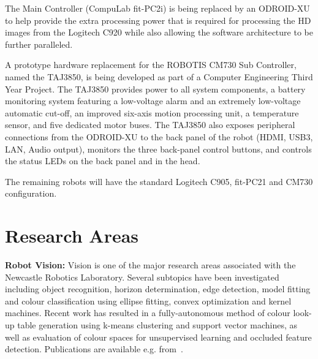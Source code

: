 \documentclass{llncs}
\begin{document}
The Main Controller (CompuLab fit-PC2i) is being replaced by an ODROID-XU to help provide the extra processing power that is required for processing the HD images from the Logitech C920 while also allowing the software architecture to be further paralleled.

A prototype hardware replacement for the ROBOTIS CM730 Sub Controller, named the TAJ3850, is 
being developed as part of a Computer Engineering Third Year Project. The TAJ3850 provides power to all system components, a battery monitoring system featuring a low-voltage alarm and an extremely low-voltage automatic cut-off, an improved six-axis motion processing unit, a temperature sensor, and five dedicated motor buses. The TAJ3850 also exposes peripheral connections from the ODROID-XU to the back panel of the robot (HDMI, USB3, LAN, Audio output), monitors the three back-panel control buttons, and controls the status LEDs on the back panel and in the head.



The remaining robots will have the standard Logitech C905, fit-PC21 and CM730 configuration.

\section{Research Areas}

\noindent\textbf{Robot Vision:} Vision is one of the major research areas associated with the Newcastle Robotics Laboratory. Several subtopics have been investigated including object recognition, horizon determination, edge detection, model fitting and colour classification using ellipse fitting, convex optimization and kernel machines. Recent work has resulted in a fully-autonomous method of colour look-up table generation using k-means clustering and support vector machines, as well as evaluation of colour spaces for unsupervised learning and occluded feature detection. Publications are available e.g. from~\cite{budden2012colour,budden2012ball,henderson_2007,nickin_2007,NUBOT2006,Henderson2008}.
\\
\end{document}

